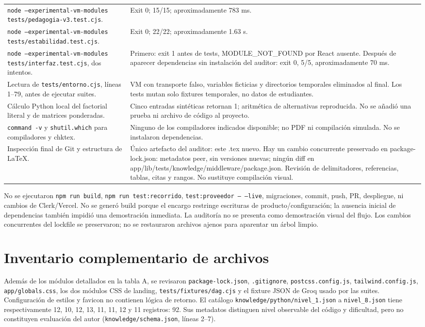 \documentclass[11pt,a4paper]{report}
\newcommand{\src}[2]{\nolinkurl{#1}, líneas #2}
\begin{document}
\begin{longtable}{P{7cm}P{9cm}}
\texttt{node --experimental-vm-modules tests/pedagogia-v3.test.cjs}. & Exit 0; 15/15; aproximadamente 783 ms.\\
\texttt{node --experimental-vm-modules tests/estabilidad.test.cjs}. & Exit 0; 22/22; aproximadamente 1.63 s.\\
\texttt{node --experimental-vm-modules tests/interfaz.test.cjs}, dos intentos. & Primero: exit 1 antes de tests, MODULE\_NOT\_FOUND por React ausente. Después de aparecer dependencias sin instalación del auditor: exit 0, 5/5, aproximadamente 70 ms.\\
Lectura de \texttt{tests/entorno.cjs}, líneas 1--79, antes de ejecutar suites. & VM con transporte falso, variables ficticias y directorios temporales eliminados al final. Los tests mutan solo fixtures temporales, no datos de estudiantes.\\
Cálculo Python local del factorial literal y de matrices ponderadas. & Cinco entradas sintéticas retornan 1; aritmética de alternativas reproducida. No se añadió una prueba ni archivo de código al proyecto.\\
\texttt{command -v} y \texttt{shutil.which} para compiladores y chktex. & Ninguno de los compiladores indicados disponible; no PDF ni compilación simulada. No se instalaron dependencias.\\
Inspección final de Git y estructura de LaTeX. & Único artefacto del auditor: este .tex nuevo. Hay un cambio concurrente preservado en package-lock.json: metadatos peer, sin versiones nuevas; ningún diff en app/lib/tests/knowledge/middleware/package.json. Revisión de delimitadores, referencias, tablas, citas y rangos. No sustituye compilación visual.\\\bottomrule
\end{longtable}

No se ejecutaron \texttt{npm run build}, \texttt{npm run test:recorrido}, \texttt{test:proveedor -- --live}, migraciones, commit, push, PR, despliegue, ni cambios de Clerk/Vercel. No se generó build porque el encargo restringe escrituras de producto/configuración; la ausencia inicial de dependencias también impidió una demostración inmediata. La auditoría no se presenta como demostración visual del flujo. Los cambios concurrentes del lockfile se preservaron; no se restauraron archivos ajenos para aparentar un árbol limpio.

\section{Inventario complementario de archivos}
Además de los módulos detallados en la tabla A, se revisaron \nolinkurl{package-lock.json}, \nolinkurl{.gitignore}, \nolinkurl{postcss.config.js}, \nolinkurl{tailwind.config.js}, \nolinkurl{app/globals.css}, los dos módulos CSS de landing, \nolinkurl{tests/fixtures/dag.cjs} y el fixture JSON de Groq usado por las suites. Configuración de estilos y favicon no contienen lógica de retorno. El catálogo \nolinkurl{knowledge/python/nivel_1.json} a \nolinkurl{nivel_8.json} tiene respectivamente 12, 10, 12, 13, 11, 11, 12 y 11 registros: 92. Sus metadatos distinguen nivel observable del código y dificultad, pero no constituyen evaluación del autor (\src{knowledge/schema.json}{2--7}).
\end{document}
